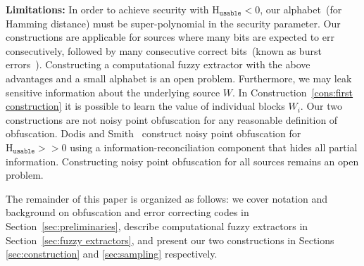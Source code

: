 \documentclass[11pt]{article}
\newcommand{\secref}[1]{\mbox{Section~\ref{#1}}}
\newcommand{\consref}[1]{\mbox{Construction~\ref{#1}}}
\newcommand{\Huse}{\mathrm{H}_{\mathtt{usable}}}
\begin{document}

\textbf{Limitations: } In order to achieve security with $\Huse<0$, our alphabet~(for Hamming distance) must be super-polynomial in the security parameter.  Our constructions are applicable for sources where many bits are expected to err consecutively, followed by many consecutive correct bits~(known as burst errors~\cite{gilbert1960capacity}).  Constructing a computational fuzzy extractor with the above advantages and a small alphabet is an open problem.  Furthermore, we may leak sensitive information about the underlying source $W$.  In \consref{cons:first construction} it is possible to learn the value of individual blocks $W_i$.  Our two constructions are not noisy point obfuscation for any reasonable definition of obfuscation.  Dodis and Smith~\cite{DBLP:conf/stoc/DodisS05} construct noisy point obfuscation for $\Huse>>0$ using a information-reconciliation component that hides all partial information.  Constructing noisy point obfuscation for all sources remains an open problem.

The remainder of this paper is organized as follows: we cover notation and background on obfuscation and error correcting codes in \secref{sec:preliminaries}, describe computational fuzzy extractors in \secref{sec:fuzzy extractors}, and present our two constructions in Sections \ref{sec:construction} and \ref{sec:sampling} respectively.
\end{document}
